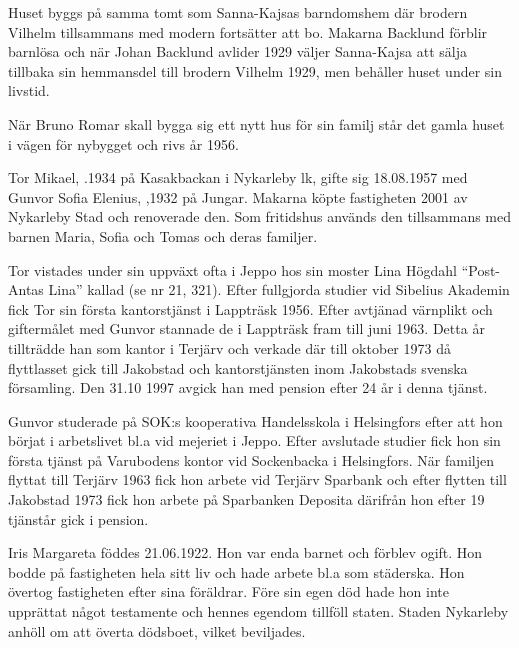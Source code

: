 Huset byggs på samma tomt som Sanna-Kajsas barndomshem där brodern Vilhelm tillsammans med modern fortsätter att bo. Makarna Backlund förblir barnlösa och när Johan Backlund avlider 1929 väljer Sanna-Kajsa att sälja tillbaka sin hemmansdel till brodern Vilhelm 1929, men behåller huset under sin livstid.

När Bruno Romar skall bygga sig ett nytt hus för sin familj står det gamla huset i vägen för nybygget och rivs år 1956.





Tor Mikael, .1934 på Kasakbackan i Nykarleby lk, gifte sig 18.08.1957 med Gunvor Sofia Elenius, ,1932 på Jungar. Makarna köpte fastigheten 2001 av Nykarleby Stad och renoverade den. Som fritidshus används den tillsammans med barnen Maria,
Sofia och Tomas och deras familjer.

Tor vistades under sin uppväxt ofta i Jeppo hos sin moster Lina Högdahl ``Post-Antas Lina'' kallad (se nr 21, 321). Efter fullgjorda studier vid Sibelius Akademin fick Tor sin första kantorstjänst i Lappträsk 1956. Efter avtjänad värnplikt och giftermålet med Gunvor stannade de i Lappträsk fram till juni 1963. Detta år tillträdde han som kantor i Terjärv och verkade där till oktober 1973 då flyttlasset gick till Jakobstad och kantorstjänsten inom Jakobstads svenska församling. Den 31.10 1997 avgick han med pension efter 24 år i denna tjänst.

Gunvor studerade på SOK:s kooperativa Handelsskola i Helsingfors efter att hon börjat i arbetslivet bl.a vid mejeriet i Jeppo. Efter avslutade studier fick hon sin första tjänst på Varubodens kontor vid Sockenbacka i Helsingfors. När familjen flyttat till Terjärv 1963 fick hon arbete vid Terjärv Sparbank och efter flytten till Jakobstad 1973 fick hon arbete på Sparbanken Deposita därifrån hon efter 19 tjänstår gick i pension.


Iris Margareta föddes 21.06.1922. Hon var enda barnet och förblev ogift. Hon bodde på fastigheten hela sitt liv och hade arbete bl.a som städerska. Hon övertog fastigheten efter sina föräldrar. Före sin egen död hade hon inte upprättat något testamente och hennes egendom tillföll staten. Staden Nykarleby anhöll om att överta dödsboet, vilket beviljades.

